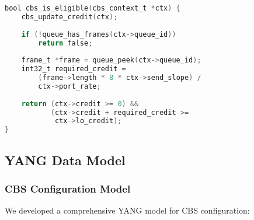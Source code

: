 \documentclass[10pt, journal, compsoc]{IEEEtran}
\begin{document}
\begin{lstlisting}[language=C, caption=Transmission Eligibility Check]
bool cbs_is_eligible(cbs_context_t *ctx) {
    cbs_update_credit(ctx);
    
    if (!queue_has_frames(ctx->queue_id))
        return false;
        
    frame_t *frame = queue_peek(ctx->queue_id);
    int32_t required_credit = 
        (frame->length * 8 * ctx->send_slope) / 
        ctx->port_rate;
    
    return (ctx->credit >= 0) && 
           (ctx->credit + required_credit >= 
            ctx->lo_credit);
}
\end{lstlisting}

\subsection{YANG Data Model}

\subsubsection{CBS Configuration Model}

We developed a comprehensive YANG model for CBS configuration:
\end{document}

